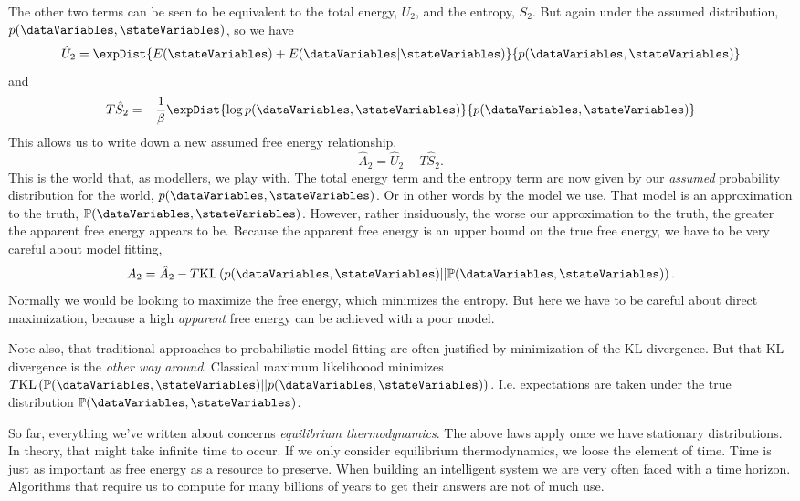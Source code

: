 The other two terms can be seen to be equivalent to the total energy,
\(U_2\), and the entropy, \(S_2\). But again under the assumed
distribution, \(p(\dataVariables, \stateVariables)\), so we have \[
\hat{U}_2 = \expDist{E(\stateVariables) +E(\dataVariables | \stateVariables)}{p(\dataVariables, \stateVariables)}
\] and \[
T\hat{S}_2 = - \frac{1}{\beta} \expDist{\log p(\dataVariables, \stateVariables)}{p(\dataVariables, \stateVariables)}
\] 
This allows us to write down a new assumed free energy relationship.
\[
\hat{A}_2 = \hat{U}_2 - T\hat{S}_2.
\] 
This is the world that, as modellers, we play with. The total energy
term and the entropy term are now given by our \emph{assumed}
probability distribution for the world,
\(p(\dataVariables, \stateVariables)\). Or in other words by the model
we use. That model is an approximation to the truth,
\(\mathbb{P}(\dataVariables, \stateVariables)\). However, rather
insiduously, the worse our approximation to the truth, the greater the
apparent free energy appears to be. Because the apparent free energy is
an upper bound on the true free energy, we have to be very careful about
model fitting, 
\[
A_2 = \hat{A}_2 - T \text{KL}\left(p(\dataVariables, \stateVariables) || \mathbb{P}(\dataVariables, \stateVariables)\right).
\] 
Normally we would be looking to maximize the free energy, which
minimizes the entropy. But here we have to be careful about direct
maximization, because a high \emph{apparent} free energy can be achieved
with a poor model.

Note also, that traditional approaches to probabilistic model fitting
are often justified by minimization of the KL divergence. But that KL
divergence is the \emph{other way around}. Classical maximum likelihoood
minimizes
\(T \text{KL}\left(\mathbb{P}(\dataVariables, \stateVariables) || p(\dataVariables, \stateVariables)\right)\).
I.e. expectations are taken under the true distribution
\(\mathbb{P}(\dataVariables, \stateVariables)\).

So far, everything we've written about concerns \emph{equilibrium
thermodynamics}. The above laws apply once we have stationary
distributions. In theory, that might take infinite time to occur. If we
only consider equilibrium thermodynamics, we loose the element of time.
Time is just as important as free energy as a resource to preserve. When
building an intelligent system we are very often faced with a time
horizon. Algorithms that require us to compute for many billions of
years to get their answers are not of much use.

